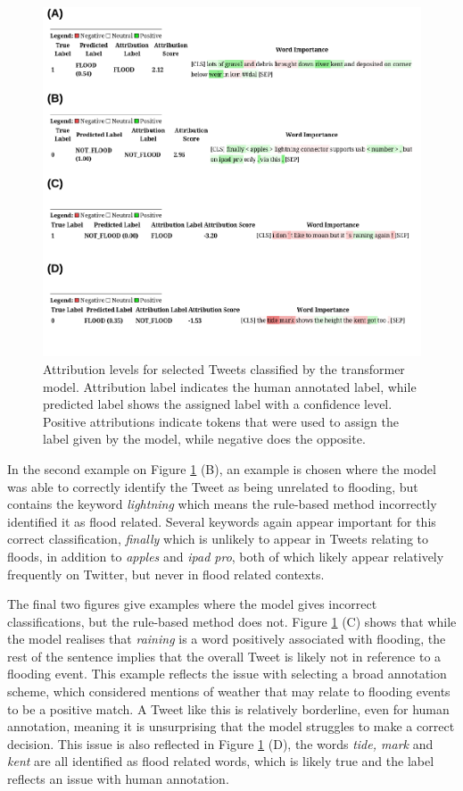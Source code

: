 \documentclass[a4paper, notitlepage]{extreport}
\begin{document}
\begin{figure}[tb]

{\centering \includegraphics[width=.75\linewidth]{index_files/figure-latex/transformerviz-1} 

}

\caption{Attribution levels for selected Tweets classified by the transformer model. Attribution label indicates the human annotated label, while predicted label shows the assigned label with a confidence level. Positive attributions indicate tokens that were used to assign the label given by the model, while negative does the opposite.}\label{fig:transformerviz}
\end{figure}

In the second example on Figure \ref{fig:transformerviz} (B), an example
is chosen where the model was able to correctly identify the Tweet as
being unrelated to flooding, but contains the keyword \emph{lightning}
which means the rule-based method incorrectly identified it as flood
related. Several keywords again appear important for this correct
classification, \emph{finally} which is unlikely to appear in Tweets
relating to floods, in addition to \emph{apples} and \emph{ipad pro},
both of which likely appear relatively frequently on Twitter, but never
in flood related contexts.

The final two figures give examples where the model gives incorrect
classifications, but the rule-based method does not. Figure
\ref{fig:transformerviz} (C) shows that while the model realises that
\emph{raining} is a word positively associated with flooding, the rest
of the sentence implies that the overall Tweet is likely not in
reference to a flooding event. This example reflects the issue with
selecting a broad annotation scheme, which considered mentions of
weather that may relate to flooding events to be a positive match. A
Tweet like this is relatively borderline, even for human annotation,
meaning it is unsurprising that the model struggles to make a correct
decision. This issue is also reflected in Figure
\ref{fig:transformerviz} (D), the words \emph{tide, mark} and
\emph{kent} are all identified as flood related words, which is likely
true and the label reflects an issue with human annotation.
\end{document}
